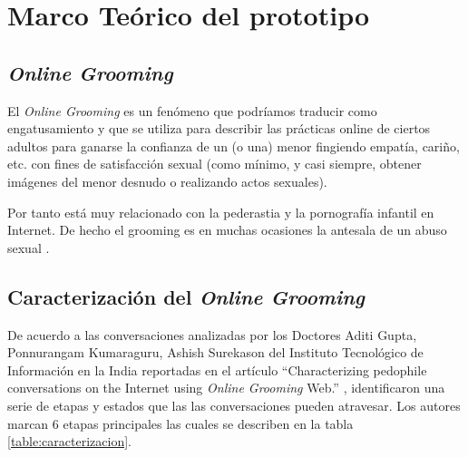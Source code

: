 \section{Marco Te\'orico del prototipo}

\subsection{\textit{Online Grooming}}
El \textit{Online Grooming} es un fen\'omeno que podr\'iamos traducir como engatusamiento y que se utiliza para describir las pr\'acticas online de ciertos adultos para ganarse la confianza de un (o una) menor fingiendo empat\'ia, cariño, etc. con fines de satisfacción sexual (como m\'inimo, y casi siempre, obtener im\'agenes del menor desnudo o realizando actos sexuales).

Por tanto est\'a muy relacionado con la pederastia y la pornograf\'ia infantil en Internet. De hecho el grooming es en muchas ocasiones la antesala de un abuso sexual \cite{grooming}.

\subsection{Caracterización del \textit{Online Grooming}}
De acuerdo a las conversaciones analizadas por los Doctores Aditi Gupta, Ponnurangam Kumaraguru, Ashish Surekason del Instituto Tecnol\'ogico de Informaci\'on en la India reportadas en el art\'iculo  ``Characterizing pedophile conversations on the Internet using \textit{Online Grooming} Web.'' \cite{articulo}, identificaron una serie de etapas y estados que las  las conversaciones pueden atravesar. Los autores marcan 6 etapas principales las cuales se describen en la tabla \ref{table:caracterizacion}.


